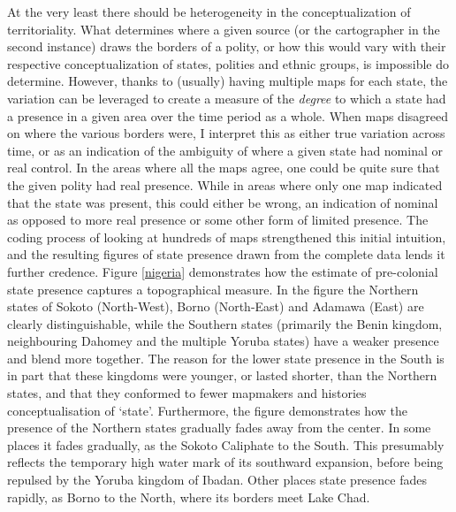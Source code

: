 \documentclass[12pt]{article}
\begin{document}
At the very least there should be heterogeneity in the conceptualization of
territoriality. What determines where a given source (or the cartographer in the
second instance) draws the borders of a polity, or how this would vary with
their respective conceptualization of states, polities and ethnic groups, is
impossible do determine. However, thanks to (usually) having multiple maps for
each state, the variation can be leveraged to create a measure of the
\textit{degree} to which a state had a presence in a given area over the time
period as a whole. When maps disagreed on where the various borders were, I
interpret this as either true variation across time, or as an indication of the
ambiguity of where a given state had nominal or real control. In the areas where
all the maps agree, one could be quite sure that the given polity had real
presence.  While in areas where only one map indicated that the state was
present, this could either be wrong, an indication of nominal as opposed to more
real presence or some other form of limited presence. The coding process of
looking at hundreds of maps strengthened this initial intuition, and the
resulting figures of state presence drawn from the complete data lends it
further credence. Figure \ref{nigeria} demonstrates how the estimate of
pre-colonial state presence captures a topographical measure. In the figure the
Northern states of Sokoto (North-West), Borno (North-East) and Adamawa (East)
are clearly distinguishable, while the Southern states (primarily the Benin
kingdom, neighbouring Dahomey and the multiple Yoruba states) have a weaker
presence and blend more together. The reason for the lower state presence in the
South is in part that these kingdoms were younger, or lasted shorter, than the
Northern states, and that they conformed to fewer mapmakers and histories
conceptualisation of `state'. Furthermore, the figure demonstrates how the
presence of the Northern states gradually fades away from the center. In some
places it fades gradually, as the Sokoto Caliphate to the South. This presumably
reflects the temporary high water mark of its southward expansion, before being
repulsed by the Yoruba kingdom of Ibadan. Other places state presence fades
rapidly, as Borno to the North, where its borders meet Lake Chad.

\end{document}
